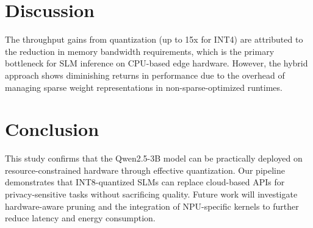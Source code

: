 \documentclass[10pt,journal,compsoc]{IEEEtran}
\begin{document}
\section{Discussion}
The throughput gains from quantization (up to 15x for INT4) are attributed to the reduction in memory bandwidth requirements, which is the primary bottleneck for SLM inference on CPU-based edge hardware. However, the hybrid approach shows diminishing returns in performance due to the overhead of managing sparse weight representations in non-sparse-optimized runtimes.

\section{Conclusion}
This study confirms that the Qwen2.5-3B model can be practically deployed on resource-constrained hardware through effective quantization. Our pipeline demonstrates that INT8-quantized SLMs can replace cloud-based APIs for privacy-sensitive tasks without sacrificing quality. Future work will investigate hardware-aware pruning and the integration of NPU-specific kernels to further reduce latency and energy consumption.
\end{document}
